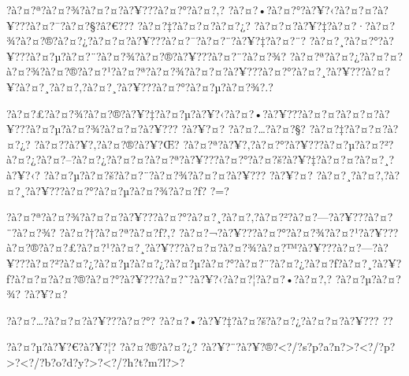 \documentclass[11pt, openany]{book}
\begin{document}
{{{{{{{{{{{{{{{{?à?¤?ª?à?¤?¾?à?¤?¤?à?¥???à?¤?°?à?¤?‚?
?à?¤?•?à?¤?°?à?¥?‹?à?¤?¤?à?¥???à?¤?¯?à?¤?§?â?€??? ?à?¤?‡?à?¤?¤?à?¤?¿?
?à?¤?¤?à?¥?‡?à?¤?·?à?¤?¾?à?¤?®?à?¤?¿?à?¤?¤?à?¥???à?¤?¯?à?¤?¨?à?¥?‡?à?¤?¨?
?à?¤?¸?à?¤?°?à?¥???à?¤?µ?à?¤?¨?à?¤?¾?à?¤?®?à?¥???à?¤?¨?à?¤?¾?
?à?¤?ª?à?¤?¿?à?¤?¤?à?¤?¾?à?¤?®?à?¤?¹?à?¤?ª?à?¤?¾?à?¤?¤?à?¥???à?¤?°?à?¤?¸?à?¥???à?¤?¥?à?¤?¸?à?¤?‚?à?¤?¸?à?¥???à?¤?°?à?¤?µ?à?¤?¾?.?

?à?¤?£?à?¤?¾?à?¤?®?à?¥?‡?à?¤?µ?à?¥?‹?à?¤?•?à?¥???à?¤?¤?à?¤?¤?à?¥???à?¤?µ?à?¤?¾?à?¤?¤?à?¥???
?à?¥?¤? ?à?¤?\ldots{}?à?¤?§? ?à?¤?‡?à?¤?¤?à?¤?¿?
?à?¤?­?à?¥?‚?à?¤?®?à?¥?Œ?
?à?¤?ª?à?¥?‚?à?¤?°?à?¥???à?¤?µ?à?¤?²?à?¤?¿?à?¤?--?à?¤?¿?à?¤?¤?à?¤?ª?à?¥???à?¤?°?à?¤?š?à?¥?‡?à?¤?¤?à?¤?¸?à?¥?‹?
?à?¤?µ?à?¤?š?à?¤?¨?à?¤?¾?à?¤?¤?à?¥??? ?à?¥?¤?
?à?¤?¸?à?¤?‚?à?¤?¸?à?¥???à?¤?°?à?¤?µ?à?¤?¾?à?¤?ƒ? ?=?

?à?¤?ª?à?¤?¾?à?¤?¤?à?¥???à?¤?°?à?¤?¸?à?¤?‚?à?¤?²?à?¤?---?à?¥???à?¤?¨?à?¤?¾?
?à?¤?†?à?¤?ª?à?¤?ƒ?,?
?à?¤?¬?à?¥???à?¤?°?à?¤?¾?à?¤?¹?à?¥???à?¤?®?à?¤?£?à?¤?¹?à?¤?¸?à?¥???à?¤?¤?à?¤?¾?à?¤?™?à?¥???à?¤?---?à?¥???à?¤?²?à?¤?¿?à?¤?µ?à?¤?¿?à?¤?µ?à?¤?°?à?¤?¨?à?¤?¿?à?¤?ƒ?à?¤?¸?à?¥?ƒ?à?¤?¤?à?¤?®?à?¤?°?à?¥???à?¤?˜?à?¥?‹?à?¤?¦?à?¤?•?à?¤?‚?
?à?¤?µ?à?¤?¾? ?à?¥?¤?

?à?¤?\ldots{}?à?¤?¤?à?¥???à?¤?°? ?à?¤?•?à?¥?‡?à?¤?š?à?¤?¿?à?¤?¤?à?¥???
?\textbar{}?

?à?¤?µ?à?¥?€?à?¥?¦? ?à?¤?®?à?¤?¿?
?à?¥?¨?à?¥?®?\textless{}?/?s?p?a?n?\textgreater{}?\textless{}?/?p?\textgreater{}?\textless{}?/?b?o?d?y?\textgreater{}?\textless{}?/?h?t?m?l?\textgreater{}?

}}}}}}}}}}}}}}}}
\end{document}
